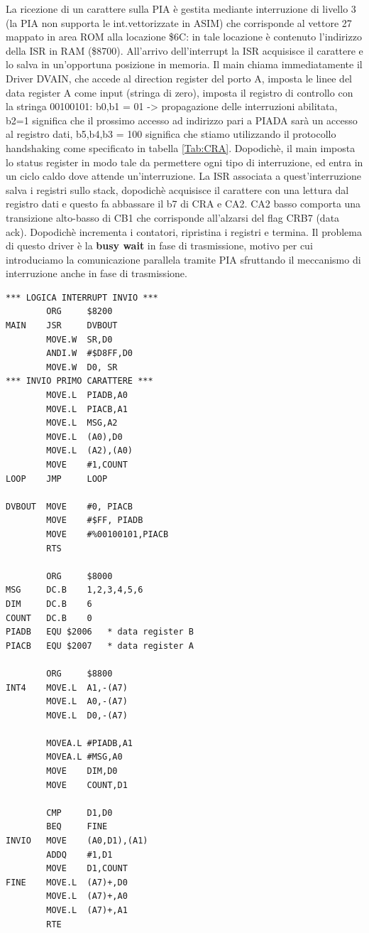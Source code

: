 La ricezione di un carattere sulla PIA è gestita mediante
interruzione di livello 3 (la PIA non supporta le int.vettorizzate in ASIM) che corrisponde al vettore 27 mappato in area ROM alla locazione \$6C: in tale locazione è contenuto l'indirizzo della ISR in RAM (\$8700). All'arrivo dell'interrupt la ISR acquisisce il carattere e lo salva in un'opportuna posizione in memoria.
Il main chiama immediatamente il Driver DVAIN, che accede al direction register del porto A, imposta le linee del data register A come input (stringa di zero), imposta il registro di controllo con la stringa 00100101: b0,b1 = 01 -> propagazione delle interruzioni abilitata, b2=1 significa che il prossimo accesso ad indirizzo pari a PIADA sarà un accesso al registro dati, b5,b4,b3 = 100 significa che stiamo utilizzando il protocollo handshaking come specificato in tabella \ref{Tab:CRA}.
Dopodichè, il main imposta lo status register in modo tale da permettere ogni tipo di interruzione, ed entra in un ciclo caldo dove attende un'interruzione.
La ISR associata a quest'interruzione salva i registri sullo stack, dopodichè acquisisce il carattere con una lettura dal registro dati e questo fa abbassare il b7 di CRA e CA2. CA2 basso comporta una transizione alto-basso di CB1 che corrisponde all'alzarsi del flag CRB7 (data ack).
Dopodichè incrementa i contatori, ripristina i registri e termina. 
Il problema di questo driver è la \textbf{busy wait} in fase di trasmissione, motivo per cui introduciamo la comunicazione parallela tramite PIA sfruttando il meccanismo di interruzione anche in fase di trasmissione.
\\
\begin{lstlisting}
*** LOGICA INTERRUPT INVIO ***
        ORG     $8200
MAIN    JSR     DVBOUT
        MOVE.W  SR,D0 
        ANDI.W  #$D8FF,D0
        MOVE.W  D0, SR 
*** INVIO PRIMO CARATTERE ***
        MOVE.L  PIADB,A0 
        MOVE.L  PIACB,A1 
        MOVE.L  MSG,A2
        MOVE.L  (A0),D0 
        MOVE.L  (A2),(A0)
        MOVE    #1,COUNT
LOOP    JMP     LOOP 

DVBOUT  MOVE    #0, PIACB
        MOVE    #$FF, PIADB
        MOVE    #%00100101,PIACB
        RTS

        ORG     $8000
MSG     DC.B    1,2,3,4,5,6
DIM     DC.B    6
COUNT   DC.B    0
PIADB   EQU $2006   * data register B
PIACB   EQU $2007   * data register A

        ORG     $8800
INT4    MOVE.L  A1,-(A7)
        MOVE.L  A0,-(A7)
        MOVE.L  D0,-(A7)

        MOVEA.L #PIADB,A1 
        MOVEA.L #MSG,A0 
        MOVE    DIM,D0 
        MOVE    COUNT,D1 

        CMP     D1,D0 
        BEQ     FINE 
INVIO   MOVE    (A0,D1),(A1)
        ADDQ    #1,D1 
        MOVE    D1,COUNT 
FINE    MOVE.L  (A7)+,D0 
        MOVE.L  (A7)+,A0
        MOVE.L  (A7)+,A1 
        RTE
\end{lstlisting}

